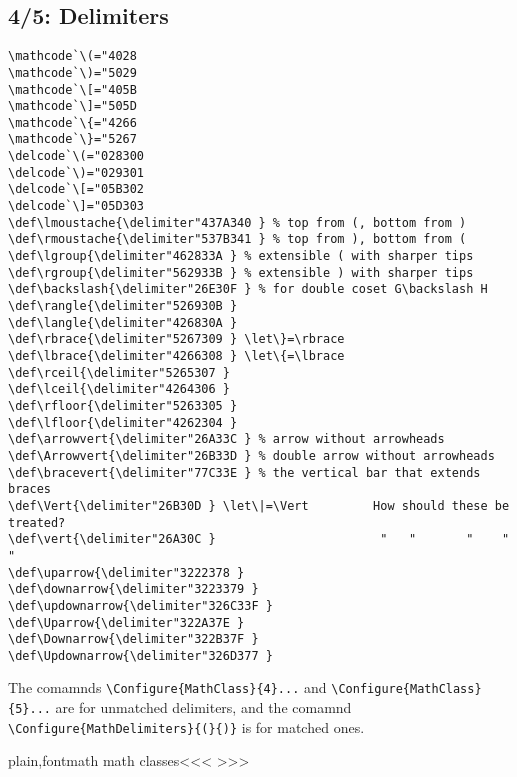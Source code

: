 {{{{{{\subsection{4/5: Delimiters}

\begin{verbatim}
\mathcode`\(="4028
\mathcode`\)="5029
\mathcode`\[="405B
\mathcode`\]="505D
\mathcode`\{="4266
\mathcode`\}="5267
\delcode`\(="028300
\delcode`\)="029301
\delcode`\[="05B302
\delcode`\]="05D303
\def\lmoustache{\delimiter"437A340 } % top from (, bottom from )
\def\rmoustache{\delimiter"537B341 } % top from ), bottom from (
\def\lgroup{\delimiter"462833A } % extensible ( with sharper tips
\def\rgroup{\delimiter"562933B } % extensible ) with sharper tips
\def\backslash{\delimiter"26E30F } % for double coset G\backslash H
\def\rangle{\delimiter"526930B }
\def\langle{\delimiter"426830A }
\def\rbrace{\delimiter"5267309 } \let\}=\rbrace
\def\lbrace{\delimiter"4266308 } \let\{=\lbrace
\def\rceil{\delimiter"5265307 }
\def\lceil{\delimiter"4264306 }
\def\rfloor{\delimiter"5263305 }
\def\lfloor{\delimiter"4262304 }
\def\arrowvert{\delimiter"26A33C } % arrow without arrowheads
\def\Arrowvert{\delimiter"26B33D } % double arrow without arrowheads
\def\bracevert{\delimiter"77C33E } % the vertical bar that extends braces
\def\Vert{\delimiter"26B30D } \let\|=\Vert         How should these be treated?
\def\vert{\delimiter"26A30C }                       "   "       "    "   "
\def\uparrow{\delimiter"3222378 }
\def\downarrow{\delimiter"3223379 }
\def\updownarrow{\delimiter"326C33F }
\def\Uparrow{\delimiter"322A37E }
\def\Downarrow{\delimiter"322B37F }
\def\Updownarrow{\delimiter"326D377 }
\end{verbatim}

The comamnds \verb'\Configure{MathClass}{4}...'
and \verb'\Configure{MathClass}{5}...'
are for unmatched delimiters, and the comamnd
\verb'\Configure{MathDelimiters}{(}{)}' is for matched ones.


\<plain,fontmath math classes\><<<
>>>

}}}}}}
